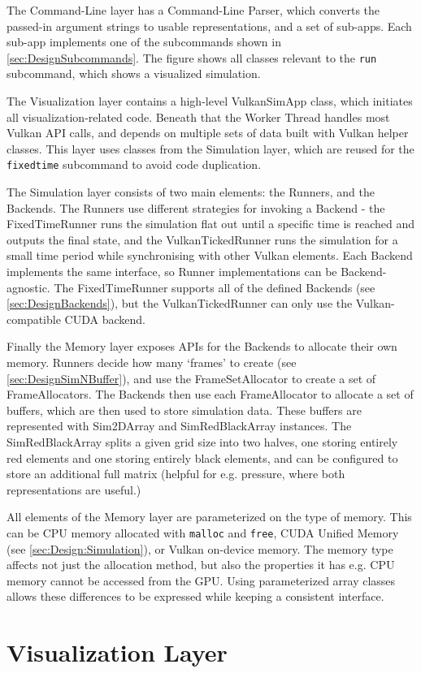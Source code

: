 The Command-Line layer has a Command-Line Parser, which converts the passed-in argument strings to usable representations, and a set of sub-apps.
Each sub-app implements one of the subcommands shown in \cref{sec:DesignSubcommands}.
The figure shows all classes relevant to the \texttt{run} subcommand, which shows a visualized simulation.

The Visualization layer contains a high-level VulkanSimApp class, which initiates all visualization-related code.
Beneath that the Worker Thread handles most Vulkan API calls, and depends on multiple sets of data built with Vulkan helper classes.
This layer uses classes from the Simulation layer, which are reused for the \texttt{fixedtime} subcommand to avoid code duplication.

The Simulation layer consists of two main elements: the Runners, and the Backends.
The Runners use different strategies for invoking a Backend - the FixedTimeRunner runs the simulation flat out until a specific time is reached and outputs the final state, and the VulkanTickedRunner runs the simulation for a small time period while synchronising with other Vulkan elements.
Each Backend implements the same interface, so Runner implementations can be Backend-agnostic.
The FixedTimeRunner supports all of the defined Backends (see \cref{sec:DesignBackends}), but the VulkanTickedRunner can only use the Vulkan-compatible CUDA backend.

Finally the Memory layer exposes APIs for the Backends to allocate their own memory.
Runners decide how many `frames' to create (see \cref{sec:DesignSimNBuffer}), and use the FrameSetAllocator to create a set of FrameAllocators.
The Backends then use each FrameAllocator to allocate a set of buffers, which are then used to store simulation data.
These buffers are represented with Sim2DArray and SimRedBlackArray instances.
The SimRedBlackArray splits a given grid size into two halves, one storing entirely red elements and one storing entirely black elements, and can be configured to store an additional full matrix (helpful for e.g. pressure, where both representations are useful.)

All elements of the Memory layer are parameterized on the type of memory.
This can be CPU memory allocated with \texttt{malloc} and \texttt{free}, CUDA Unified Memory (see \cref{sec:Design:Simulation}), or Vulkan on-device memory. 
The memory type affects not just the allocation method, but also the properties it has e.g. CPU memory cannot be accessed from the GPU.
Using parameterized array classes allows these differences to be expressed while keeping a consistent interface.



\pagebreak
\section{Visualization Layer}



